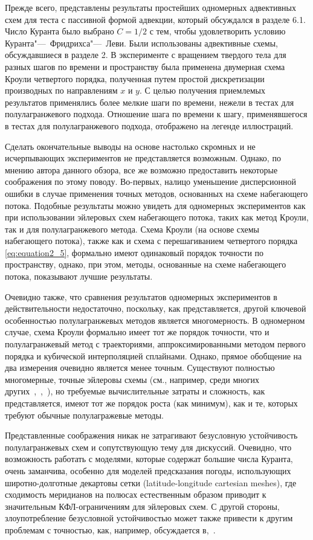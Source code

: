 Прежде всего, представлены результаты простейших одномерных адвективных схем для теста с пассивной формой адвекции, который обсуждался в разделе 6.1. Число Куранта было выбрано $C=1/2$  с тем, чтобы удовлетворить условию Куранта"---~Фридрихса"---~Леви. Были использованы адвективные схемы, обсуждавшиеся в разделе 2. В эксперименте с вращением твердого тела для разных шагов по времени и пространству была применена двумерная схема Кроули четвертого порядка, полученная путем простой дискретизации производных по направлениям $x$ и $y$. С целью получения приемлемых результатов применялись более мелкие шаги по времени, нежели в тестах для полулагранжевого подхода. Отношение шага по времени к шагу, применявшегося в тестах для полулагранжевого подхода, отображено на легенде иллюстраций.
%

Сделать окончательные выводы на основе настолько скромных и не исчерпывающих экспериментов не представляется возможным. Однако, по мнению автора данного обзора, все же возможно предоставить некоторые соображения по этому поводу. Во-первых, налицо уменьшение дисперсионной ошибки в случае применения точных методов, основанных на схеме набегающего потока. Подобные результаты можно увидеть для одномерных экспериментов как при использовании эйлеровых схем набегающего потока, таких как метод Кроули, так и для полулагранжевого метода. Схема Кроули (на основе схемы набегающего потока), также как и схема с перешагиванием четвертого порядка \eqref{eq:equation2_5}, формально имеют одинаковый порядок точности по пространству, однако, при этом, методы, основанные на схеме набегающего потока, показывают лучшие результаты.

Очевидно также, что сравнения результатов одномерных экспериментов в действительности недостаточно, поскольку, как представляется, другой ключевой особенностью полулагранжевых методов является многомерность. В одномерном случае, схема Кроули формально имеет тот же порядок точности, что и полулагранжевый метод с траекториями, аппроксимированными методом первого порядка и кубической интерполяцией сплайнами. Однако, прямое обобщение на два измерения очевидно является менее точным. Существуют полностью многомерные, точные эйлеровы схемы (см., например, среди многих других~\cite{A32},~\cite{A64},~\cite{A66}), но требуемые вычислительные затраты и сложность, как представляется, имеют тот же порядок роста (как минимум), как и те, которых требуют обычные полулагражевые методы.

Представленные соображения никак не затрагивают безусловную устойчивость полулагранжевых схем и сопутствующую тему для дискуссий. Очевидно, что возможность работать с моделями, которые содержат большие числа Куранта, очень заманчива, особенно для моделей предсказания погоды, использующих широтно-долготные декартовы сетки (latitude-longitude cartesian meshes), где сходимость меридианов на полюсах естественным образом приводит к значительным КФЛ-ограничениям для эйлеровых схем. С другой стороны, злоупотребление безусловной устойчивостью может также привести к другим проблемам с точностью, как, например, обсуждается в\cite{A2},~\cite{A26}.

